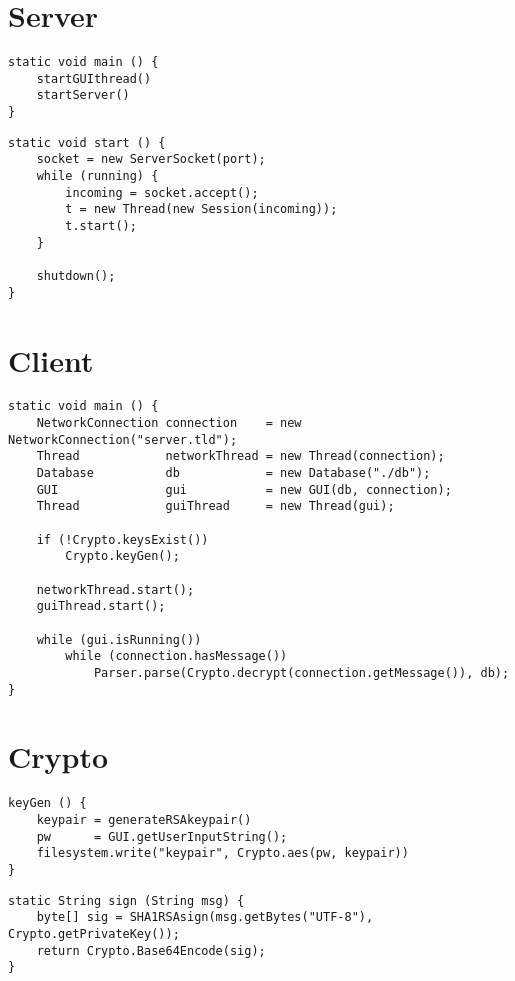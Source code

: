 \section{Server}
\begin{lstlisting}
static void main () {
    startGUIthread()
    startServer()
}
\end{lstlisting}

\begin{lstlisting}
static void start () {
    socket = new ServerSocket(port);
    while (running) {
        incoming = socket.accept();
        t = new Thread(new Session(incoming));
        t.start();
    }
    
    shutdown();
}
\end{lstlisting}

\section{Client}
\begin{lstlisting}
static void main () {
    NetworkConnection connection    = new NetworkConnection("server.tld");
    Thread            networkThread = new Thread(connection);
    Database          db            = new Database("./db");
    GUI               gui           = new GUI(db, connection);
    Thread            guiThread     = new Thread(gui);
        
    if (!Crypto.keysExist())
        Crypto.keyGen();
        
    networkThread.start();
    guiThread.start();
        
    while (gui.isRunning())
        while (connection.hasMessage())
            Parser.parse(Crypto.decrypt(connection.getMessage()), db);
}
\end{lstlisting}

\section{Crypto}
\begin{lstlisting}
keyGen () {
    keypair = generateRSAkeypair()
    pw      = GUI.getUserInputString();
    filesystem.write("keypair", Crypto.aes(pw, keypair))
}
\end{lstlisting}

\begin{lstlisting}
static String sign (String msg) {
    byte[] sig = SHA1RSAsign(msg.getBytes("UTF-8"), Crypto.getPrivateKey());
    return Crypto.Base64Encode(sig);
}
\end{lstlisting}

